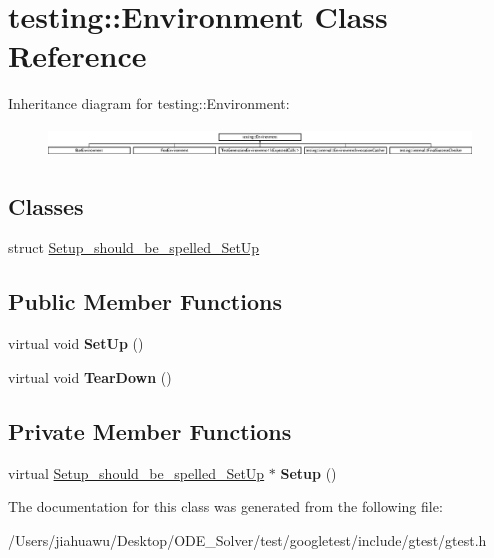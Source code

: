 \hypertarget{classtesting_1_1_environment}{}\section{testing\+:\+:Environment Class Reference}
\label{classtesting_1_1_environment}
Inheritance diagram for testing\+:\+:Environment\+:\begin{figure}[H]
\begin{center}
\leavevmode
\includegraphics[height=0.785965cm]{classtesting_1_1_environment}
\end{center}
\end{figure}
\subsection*{Classes}
\begin{DoxyCompactItemize}
\item 
struct \mbox{\hyperlink{structtesting_1_1_environment_1_1_setup__should__be__spelled___set_up}{Setup\+\_\+should\+\_\+be\+\_\+spelled\+\_\+\+Set\+Up}}
\end{DoxyCompactItemize}
\subsection*{Public Member Functions}
\begin{DoxyCompactItemize}
\item 
\mbox{\label{classtesting_1_1_environment_a1bf8cafaa9d4eba9feb98655ee434eb3}} 
virtual void {\bfseries Set\+Up} ()
\item 
\mbox{\label{classtesting_1_1_environment_a039bdaa705c46b9b88234cf4d3bb6254}} 
virtual void {\bfseries Tear\+Down} ()
\end{DoxyCompactItemize}
\subsection*{Private Member Functions}
\begin{DoxyCompactItemize}
\item 
\mbox{\label{classtesting_1_1_environment_a6096a69b03f6eb727a69a39f854cc87b}} 
virtual \mbox{\hyperlink{structtesting_1_1_environment_1_1_setup__should__be__spelled___set_up}{Setup\+\_\+should\+\_\+be\+\_\+spelled\+\_\+\+Set\+Up}} $\ast$ {\bfseries Setup} ()
\end{DoxyCompactItemize}


The documentation for this class was generated from the following file\+:\begin{DoxyCompactItemize}
\item 
/\+Users/jiahuawu/\+Desktop/\+O\+D\+E\+\_\+\+Solver/test/googletest/include/gtest/gtest.\+h\end{DoxyCompactItemize}
